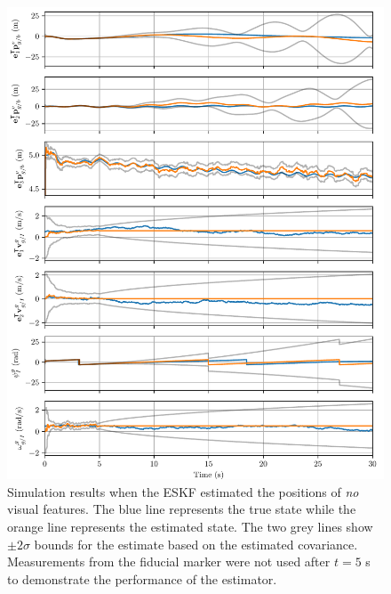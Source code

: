 \begin{figure}
  \centering
  \includegraphics[width=6.5in]{plots/single_run_no_lms}
  \caption[ESKF Simulation Results Using No Visual Features]{Simulation results when the ESKF estimated the positions of \emph{no} visual
  features. The blue line represents the true state while the orange line
  represents the estimated state. The two grey lines show $\pm 2 \sigma$ bounds for
  the estimate based on the estimated covariance. Measurements from the fiducial
  marker were not used after $t = 5$ s
  to demonstrate the performance of the estimator.}
  \label{fig:no_lms}
\end{figure}

